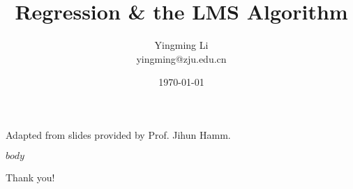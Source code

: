 \documentclass[notes]{beamer}
\title[Opt for ML]{Regression \& the LMS Algorithm}
\author[YingmingLi]{Yingming Li \\ yingming@zju.edu.cn}
\institute[DSERC, ZJU]{Data Science \& Engineering Research Center, ZJU}
\date[\today]{\today}
\newcommand{\chuhao}{\fontsize{44.9pt}{\baselineskip}\selectfont}
\begin{document}



\begin{frame}
	\titlepage
	\begin{center}
		Adapted from slides provided by Prof. Jihun Hamm.		
	\end{center}

\end{frame}

$body$

\begin{frame}
	\chuhao Thank you! %
\end{frame}
\end{document}
